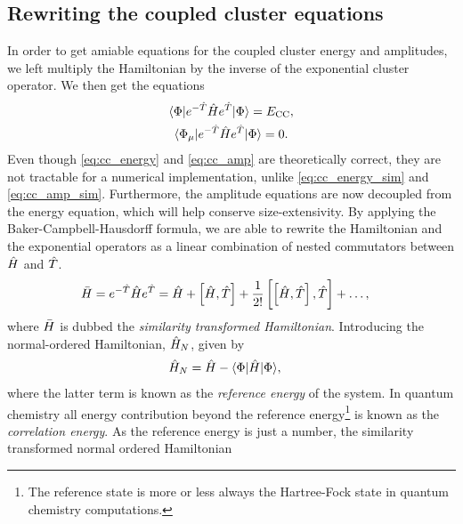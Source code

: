         \subsection{Rewriting the coupled cluster equations}
            In order to get amiable equations for the coupled cluster energy and
            amplitudes, we left multiply the Hamiltonian by the inverse of the
            exponential cluster operator.
            We then get the equations
            \begin{gather}
                \langle \Phi | e^{-\hat{T}} \hat{H} e^{\hat{T}} | \Phi \rangle
                = E_{\text{CC}},
                \label{eq:cc_energy_sim}
                \\
                \langle \Phi_{\mu} | e^{-\hat{T}} \hat{H} e^{\hat{T}} | \Phi \rangle
                = 0.
                \label{eq:cc_amp_sim}
            \end{gather}
            Even though \autoref{eq:cc_energy} and \autoref{eq:cc_amp} are
            theoretically correct, they are not tractable for a numerical
            implementation, unlike \autoref{eq:cc_energy_sim} and
            \autoref{eq:cc_amp_sim}.
            Furthermore, the amplitude equations are
            now decoupled from the energy equation, which will help conserve
            size-extensivity.
            By applying the Baker-Campbell-Hausdorff formula, we are able to
            rewrite the Hamiltonian and the exponential operators as a linear
            combination of nested commutators between $\hat{H}$ and $\hat{T}$.
            \begin{align}
                \bar{H}
                &=
                e^{-\hat{T}} \hat{H} e^{\hat{T}}
                =
                \hat{H}
                + \left[\hat{H}, \hat{T}\right]
                + \frac{1}{2!}\left[
                    \left[
                        \hat{H}
                    , 
                        \hat{T}
                    \right]
                , 
                    \hat{T}
                \right]
                + \dots,
            \end{align}
            where $\bar{H}$ is dubbed the \emph{similarity transformed
            Hamiltonian}.
            Introducing the normal-ordered Hamiltonian, $\hat{H}_N$, given by
            \begin{align}
                \hat{H}_N
                &= \hat{H} - \langle \Phi |\hat{H}| \Phi \rangle,
            \end{align}
            where the latter term is known as the \emph{reference energy} of the
            system.
            In quantum chemistry all energy contribution beyond the reference
            energy\footnote{
                The reference state is more or less always the Hartree-Fock
                state in quantum chemistry computations.
            } is known as the \emph{correlation energy}.
            As the reference energy is just a number, the similarity transformed
            normal ordered Hamiltonian


